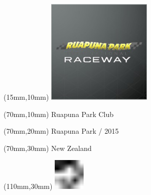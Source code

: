 \null\newpage
\begin{textblock*}{50mm}(15mm,10mm)%
\includegraphics[width=50mm]{LG/RUPU.png}
\end{textblock*}
\begin{textblock*}{130mm}(70mm,10mm)%
{\fontsize{20}{20}\selectfont Ruapuna Park Club}\\
\end{textblock*}
\begin{textblock*}{120mm}(70mm,20mm)%
{\fontsize{16}{16}\selectfont Ruapuna Park / 2015}\\
\end{textblock*}
\begin{textblock*}{120mm}(70mm,30mm)%
{\fontsize{12}{12}\selectfont New Zealand}
\end{textblock*}
\begin{textblock*}{30mm}(110mm,30mm)%
\centering
\includegraphics[height=15mm]{icons/fa-rotate-left.pdf}
\end{textblock*}
